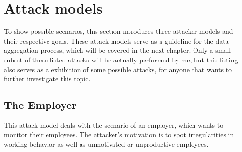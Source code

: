 \section{Attack models}\label{attack-models}
To show possible scenarios, this section introduces three attacker models and their respective goals.
These attack models serve as a guideline for the data aggregation process, which will be covered in the next chapter.
Only a small subset of these listed attacks will be actually performed by me, but this listing also serves as a exhibition of some possible attacks, for anyone that wants to further investigate this topic.

\subsection{The Employer}\label{employer-monitoring}
This attack model deals with the scenario of an employer, which wants to monitor their employees.
The attacker's motivation is to spot irregularities in working behavior as well as unmotivated or unproductive employees.

